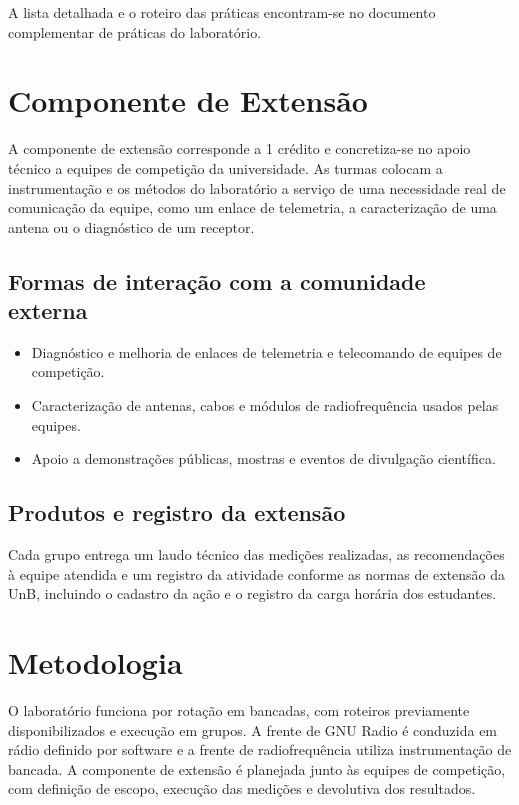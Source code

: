 \documentclass[11pt,a4paper]{article}
\begin{document}
A lista detalhada e o roteiro das práticas encontram-se no documento complementar de práticas do laboratório.

\section{Componente de Extensão}

A componente de extensão corresponde a 1 crédito e concretiza-se no apoio técnico a equipes de competição da universidade. As turmas colocam a instrumentação e os métodos do laboratório a serviço de uma necessidade real de comunicação da equipe, como um enlace de telemetria, a caracterização de uma antena ou o diagnóstico de um receptor.

\subsection*{Formas de interação com a comunidade externa}

\begin{itemize}[noitemsep]
  \item Diagnóstico e melhoria de enlaces de telemetria e telecomando de equipes de competição.
  \item Caracterização de antenas, cabos e módulos de radiofrequência usados pelas equipes.
  \item Apoio a demonstrações públicas, mostras e eventos de divulgação científica.
\end{itemize}

\subsection*{Produtos e registro da extensão}

Cada grupo entrega um laudo técnico das medições realizadas, as recomendações à equipe atendida e um registro da atividade conforme as normas de extensão da UnB, incluindo o cadastro da ação e o registro da carga horária dos estudantes.

\section{Metodologia}

O laboratório funciona por rotação em bancadas, com roteiros previamente disponibilizados e execução em grupos. A frente de GNU Radio é conduzida em rádio definido por software e a frente de radiofrequência utiliza instrumentação de bancada. A componente de extensão é planejada junto às equipes de competição, com definição de escopo, execução das medições e devolutiva dos resultados.
\end{document}
